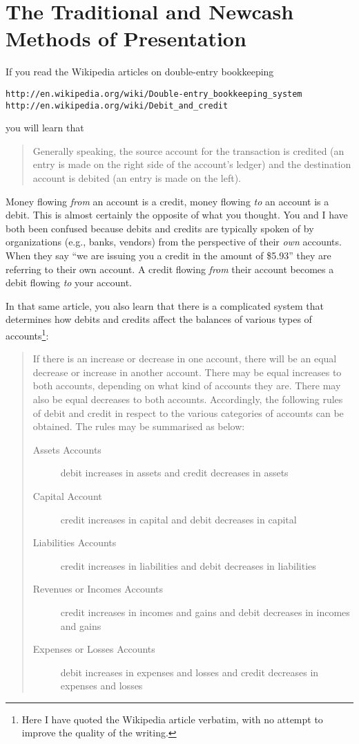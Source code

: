 \documentclass{report}
\begin{document}
\section{The Traditional and Newcash Methods of Presentation}
\label{The Traditional and Newcash Methods of Presentation}
If you read the Wikipedia articles on double-entry bookkeeping
\begin{verbatim}
http://en.wikipedia.org/wiki/Double-entry_bookkeeping_system
http://en.wikipedia.org/wiki/Debit_and_credit
\end{verbatim}
you will learn that 
\begin{quote}
Generally speaking, the source account for the transaction is credited (an entry is made on the right side of the account's ledger) and the destination account is debited (an entry is made on the left).
\end{quote}
Money flowing \emph{from} an account is a credit, money flowing \emph{to} an account is a debit. This is almost certainly the opposite of what you thought. You  and I have both been confused because debits and credits are typically spoken of by organizations (e.g., banks, vendors) from the perspective of their \emph{own} accounts. When they say ``we are issuing you a credit in the amount of \$5.93'' they are referring to their own account. A credit flowing \emph{from} their account becomes a debit flowing \emph{to} your account.

In that same article, you also learn that there is a complicated system that determines how debits and credits affect the balances of various types of accounts\footnote{Here I have quoted the Wikipedia article verbatim, with no attempt to improve the quality of the writing.}: 

\begin{quote}
If there is an increase or decrease in one account, there will be an equal decrease or increase in another account. There may be equal increases to both accounts, depending on what kind of accounts they are. There may also be equal decreases to both accounts. Accordingly, the following rules of debit and credit in respect to the various categories of accounts can be obtained. The rules may be summarised as below:
\begin{description}
\item [Assets Accounts] debit increases in assets and credit decreases in assets
\item [Capital Account] credit increases in capital and debit decreases in capital
\item [Liabilities Accounts] credit increases in liabilities and debit decreases in liabilities
\item [Revenues or Incomes Accounts] credit increases in incomes and gains and debit decreases in incomes and gains
\item [Expenses or Losses Accounts] debit increases in expenses and losses and credit decreases in expenses and losses
\end{description}
\end{quote}
\end{document}
